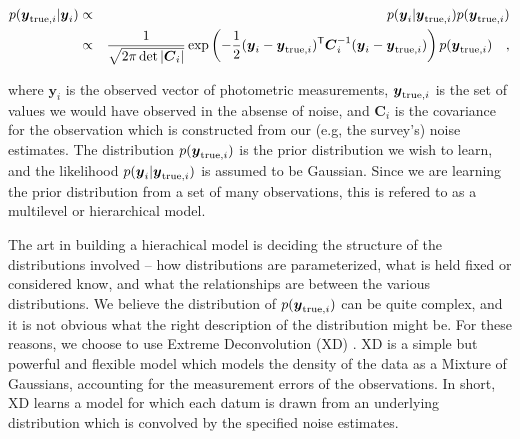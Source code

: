 \documentclass[12pt,preprint]{aastex}
\newcommand{\datavector}[1]{\boldsymbol{#1}}
\newcommand{\data}{\datavector{y}}
\newcommand{\datum}{\data_i}
\newcommand{\truedatum}{\data_{{\rm true}, i}}
\newcommand{\datacov}{\datavector{C}}
\newcommand{\datumcov}{\datacov_i}
\newcommand{\transpose}{\mathsf{T}}
\begin{document}
\begin{eqnarray}\displaystyle
p(\truedatum | \datum) & \propto & p(\datum | \truedatum) p(\truedatum) \\
                                         & \propto & \frac{1}{\sqrt{2\pi\det{|\datumcov|}}} \exp \left (-\frac{1}{2}(\datum - \truedatum)^\transpose \datumcov^{-1}(\datum - \truedatum) \right ) p(\truedatum)
\quad ,
\label{eqn:posterior}
\end{eqnarray}

\noindent where $\datum$ is the observed vector of photometric measurements, 
$\truedatum$ is the set of values we would have observed in the absense of
noise, and $\datumcov$ is the covariance for the observation which is
constructed from our (e.g, the survey's) noise estimates.  The distribution 
$p(\truedatum)$ is the prior distribution we wish to learn, and the likelihood
$p(\datum | \truedatum)$ is assumed to be Gaussian.  Since we are learning the
prior distribution from a set of many observations, this is refered to as a
multilevel or hierarchical model.

The art in building a hierachical model is deciding the structure of the
distributions involved -- how distributions are parameterized, what is held
fixed or considered know, and what the relationships are between the various
distributions.  We believe the distribution of $p(\truedatum)$ can be quite 
complex, and it is not obvious what the right description of the distribution
might be.  For these reasons, we choose to use Extreme Deconvolution (XD)
\citep{bovy09}.  XD is a simple but powerful and flexible model which models
the density of the data as a Mixture of Gaussians, accounting for the 
measurement errors of the observations.  In short, XD learns a model for which 
each datum is drawn from an underlying distribution which is convolved by the 
specified noise estimates.
\end{document}
